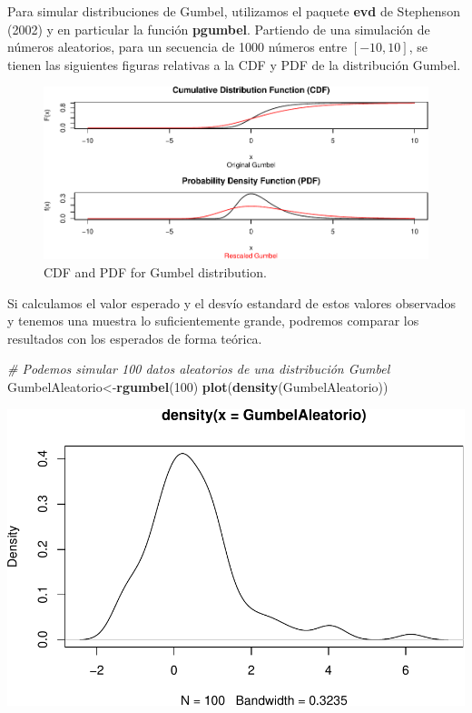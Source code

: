 \documentclass[
  oneside]{book}
\newenvironment{Shaded}{\begin{snugshade}}{\end{snugshade}}
\newcommand{\CommentTok}[1]{\textcolor[rgb]{0.56,0.35,0.01}{\textit{#1}}}
\newcommand{\DecValTok}[1]{\textcolor[rgb]{0.00,0.00,0.81}{#1}}
\newcommand{\FunctionTok}[1]{\textcolor[rgb]{0.13,0.29,0.53}{\textbf{#1}}}
\newcommand{\NormalTok}[1]{#1}
\newcommand{\OtherTok}[1]{\textcolor[rgb]{0.56,0.35,0.01}{#1}}
\begin{document}
Para simular distribuciones de Gumbel, utilizamos el paquete
\textbf{evd} de Stephenson (2002) y en particular la función
\textbf{pgumbel}. Partiendo de una simulación de números aleatorios,
para un secuencia de 1000 números entre \([-10,10]\), se tienen las
siguientes figuras relativas a la CDF y PDF de la distribución Gumbel.

\begin{figure}
\centering
\includegraphics{extremales_files/figure-latex/gumbel_plots-1.pdf}
\caption{CDF and PDF for Gumbel distribution.}
\end{figure}

Si calculamos el valor esperado y el desvío estandard de estos valores
observados y tenemos una muestra lo suficientemente grande, podremos
comparar los resultados con los esperados de forma teórica.

\begin{Shaded}
\begin{Highlighting}[]
\CommentTok{\# Podemos simular 100 datos aleatorios de una distribución Gumbel}
\NormalTok{GumbelAleatorio}\OtherTok{\textless{}{-}}\FunctionTok{rgumbel}\NormalTok{(}\DecValTok{100}\NormalTok{)}
\FunctionTok{plot}\NormalTok{(}\FunctionTok{density}\NormalTok{(GumbelAleatorio))}
\end{Highlighting}
\end{Shaded}

\includegraphics{extremales_files/figure-latex/unnamed-chunk-4-1.pdf}
\end{document}
